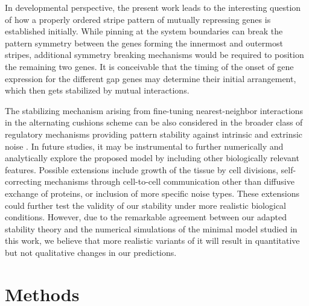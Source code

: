 \documentclass[a4paper,10pt]{article}
\begin{document}
In developmental perspective, the present work leads to the interesting question of how a properly ordered stripe pattern of mutually repressing genes is established initially. While pinning at the system boundaries can break the pattern symmetry between the genes forming the innermost and outermost stripes, additional symmetry breaking mechanisms would be required to position the remaining two genes. It is conceivable that the timing of the onset of gene expression for the different gap genes may determine their initial arrangement, which then gets stabilized by mutual interactions.

The stabilizing mechanism arising from fine-tuning nearest-neighbor interactions in the alternating cushions scheme can be also considered in the broader class of regulatory mechanisms providing pattern stability against intrinsic and extrinsic noise \cite{Simsek2022,Iyer2022,Averbukh2017}. In future studies, it may be instrumental to further numerically and analytically explore the proposed model by including other biologically relevant features. Possible extensions include growth of the tissue by cell divisions, self-correcting mechanisms through cell-to-cell communication other than diffusive exchange of proteins, or inclusion of more specific noise types. These extensions could further test the validity of our stability under more realistic biological conditions. However, due to the remarkable agreement between our adapted stability theory and the numerical simulations of the minimal model studied in this work, we believe that more realistic variants of it will result in quantitative but not qualitative changes in our predictions.


\clearpage
\section{Methods}
\label{sec-GG-Methods}
\end{document}
